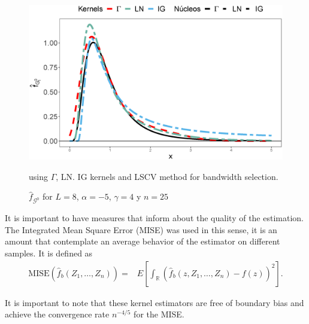 \documentclass[twocolumn]{svjour3}
\begin{document}
\begin{figure}[H]
	\centering
	\includegraphics[scale=0.35]{../../../Figures/PaperTesis/NucleosGALNyIG.eps}
	\caption{\label{EstimacionLNyGAyIG} $\widehat{f}_{\mathcal{G}^0}$ for $L=8$, $\alpha=-5$, $\gamma=4$ y $n=25$} using $\Gamma$, LN. IG kernels and LSCV method for bandwidth selection.
\end{figure}


It is important to have measures that inform about the quality of the estimation. The Integrated Mean Square Error (MISE) was used in this sense, it is an amount that
contemplate an average behavior of the estimator on different samples. It is defined as
\begin{align}
\label{Mise}
\text{MISE}(\widehat{f}_b(Z_1,\ldots,Z_n))=&E\left[\int_\mathbb{R} (\widehat{f}_b(z,Z_1,\ldots,Z_n)-f(z))^2 \right].
\end{align}

It is important to note that these kernel estimators are free of boundary bias and achieve the convergence rate $n^{-4/5}$ for the MISE.

\end{document}
